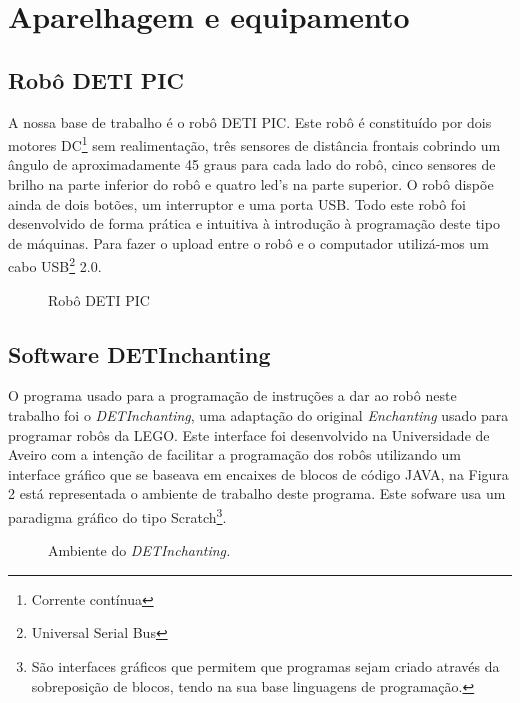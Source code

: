 \documentclass[a4paper, 12pt, onecolumn, oneside]{report}
\begin{document}
\newpage
\section{Aparelhagem e equipamento}



\subsection{Robô DETI PIC}

A nossa base de trabalho é o robô DETI PIC. Este robô é constituído por dois motores DC\footnote{Corrente contínua} sem realimentação, três sensores de distância frontais cobrindo um ângulo de aproximadamente 45 graus para cada lado do robô, cinco sensores de brilho na parte inferior do robô e quatro led's na parte superior. O robô dispõe ainda de dois botões, um interruptor e uma porta USB. Todo este robô foi desenvolvido de forma prática e intuitiva à introdução à programação deste tipo de máquinas. 
Para fazer o upload entre o robô e o computador utilizá-mos um cabo USB\footnote{Universal Serial Bus} 2.0.



\begin{figure}[H] 
\caption{Robô DETI PIC}
\label{fig:speciation}
\end{figure}


\subsection{Software DETInchanting}

O programa usado para a programação de instruções a dar ao robô neste trabalho foi o \emph{DETInchanting}, uma adaptação do original \emph{Enchanting} usado para programar robôs da LEGO. Este interface foi desenvolvido na Universidade de Aveiro com a intenção de facilitar a programação dos robôs utilizando um interface gráfico que se baseava em encaixes de blocos de código JAVA, na Figura 2 está representada o ambiente de trabalho deste programa. Este sofware usa um paradigma gráfico do tipo Scratch\footnote{São interfaces gráficos que permitem que programas sejam criado através da sobreposição de blocos, tendo na sua base linguagens de programação.}.



\begin{figure}[H] 
\caption{Ambiente do \emph{DETInchanting.}}
\label{fig:speciation}
\end{figure}
\end{document}
